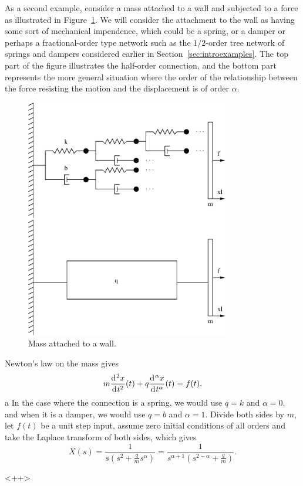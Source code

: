 \begin{example}
  As a second example, consider a mass attached to a wall and subjected to a force as illustrated in Figure~\ref{fig:masswall}. We will consider the attachment to the wall as having some sort of mechanical impendence, which could be a spring, or a damper or perhaps a fractional-order type network such as the $1/2$-order tree network of springs and dampers considered earlier in Section~\ref{sec:introexamples}. The top part of the figure illustrates the half-order connection, and the bottom part represents the more general situation where the order of the relationship between the force resisting the motion and the displacement is of order $\alpha$.

  \begin{figure}
    \centering
    \includegraphics[width=3.5in]{figs/structurewall}
    \caption{Mass attached to a wall.}
    \label{fig:masswall}
  \end{figure}

  Newton's law on the mass gives
  \begin{equation*}
    m \frac{\operatorname{d}\hspace*{-1pt}^2 x}{\operatorname{d}\hspace*{-1pt} t^2}(t) + q \frac{\operatorname{d}\hspace*{-1pt}^\alpha x}{\operatorname{d}\hspace*{-1pt} t^\alpha}(t) = f(t).
  \end{equation*}a
  In the case where the connection is a spring, we would use $q = k$ and $\alpha = 0$, and when it is a damper, we would use $q = b$ and $\alpha = 1$. Divide both sides by $m$, let $f(t)$ be a unit step input, assume zero initial conditions of all orders and take the Laplace transform of both sides, which gives
  \begin{equation*}
    X(s) = \frac{1}{s \left(s^2 + \frac{q}{m} s^\alpha \right)} = \frac{1}{s^{\alpha + 1} \left( s^{2 - \alpha} + \frac{q}{m} \right) }.
  \end{equation*}
\end{example}<++>
